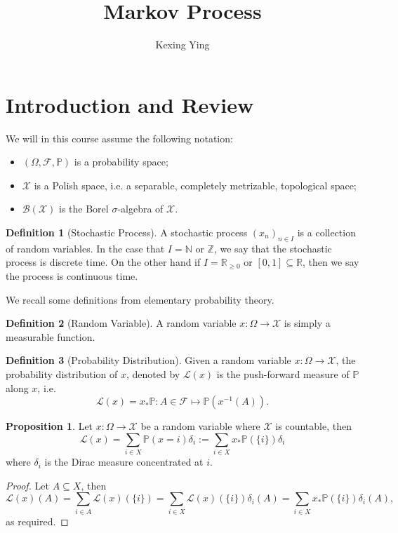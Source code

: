 \documentclass[]{article}
\title{Markov Process}
\author{Kexing Ying}
\theoremstyle{definition}
\theoremstyle{definition}
\newtheorem{definition}{Definition}[section]
\newtheorem{proposition}{Proposition}[section]
\begin{document}
\maketitle

{
\hypersetup{linkcolor=}
\setcounter{tocdepth}{2}
\tableofcontents
}
\newpage

\section{Introduction and Review}

We will in this course assume the following notation:
\begin{itemize}
  \item \((\Omega, \mathcal{F}, \mathbb{P})\) is a probability space;
  \item \(\mathcal{X}\) is a Polish space, i.e. a separable, completely 
    metrizable, topological space;
  \item \(\mathcal{B}(\mathcal{X})\) is the Borel \(\sigma\)-algebra of \(\mathcal{X}\).
\end{itemize}

\begin{definition}[Stochastic Process]
  A stochastic process \((x_n)_{n \in I}\) is a collection of random variables. 
  In the case that \(I = \mathbb{N}\) or \(\mathbb{Z}\), we say that the 
  stochastic process is discrete time. On the other hand if \(I = \mathbb{R}_{\ge 0}\) 
  or \([0, 1] \subseteq \mathbb{R}\), then we say the process is continuous time.  
\end{definition}

We recall some definitions from elementary probability theory. 

\begin{definition}[Random Variable]
  A random variable \(x : \Omega \to \mathcal{X}\) is simply a measurable function.
\end{definition}

\begin{definition}[Probability Distribution]
  Given a random variable \(x : \Omega \to \mathcal{X}\), the probability 
  distribution of \(x\), denoted by \(\mathcal{L}(x)\) is the push-forward 
  measure of \(\mathbb{P}\) along \(x\), i.e. 
  \[\mathcal{L}(x) = x_* \mathbb{P} : A \in \mathcal{F} \mapsto \mathbb{P}(x^{-1}(A)).\]
\end{definition}

\begin{proposition}
  Let \(x : \Omega \to \mathcal{X}\) be a random variable where \(\mathcal{X}\) 
  is countable, then
  \[\mathcal{L}(x) = \sum_{i \in X} \mathbb{P}(x = i) \delta_i := 
    \sum_{i \in X} x_* \mathbb{P}(\{i\}) \delta_i\]
  where \(\delta_i\) is the Dirac measure concentrated at \(i\).
\end{proposition}
\begin{proof}
  Let \(A \subseteq X\), then 
  \[\mathcal{L}(x)(A) = \sum_{i \in A} \mathcal{L}(x)(\{i\}) = 
    \sum_{i \in X} \mathcal{L}(x)(\{i\})\delta_i(A) = 
    \sum_{i \in X} x_* \mathbb{P}(\{i\}) \delta_i(A),\]
  as required.
\end{proof}
\end{document}
